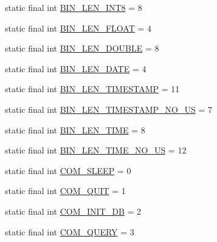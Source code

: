 \begin{DoxyCompactItemize}
static final int \mbox{\hyperlink{classcom_1_1mysql_1_1cj_1_1protocol_1_1a_1_1_native_constants_ac39a2cd0b5ccf2a222caea799aa70fb5}{B\+I\+N\+\_\+\+L\+E\+N\+\_\+\+I\+N\+T8}} = 8
\item 
static final int \mbox{\hyperlink{classcom_1_1mysql_1_1cj_1_1protocol_1_1a_1_1_native_constants_afbb783ba118a4c920b178941f1a10ef8}{B\+I\+N\+\_\+\+L\+E\+N\+\_\+\+F\+L\+O\+AT}} = 4
\item 
static final int \mbox{\hyperlink{classcom_1_1mysql_1_1cj_1_1protocol_1_1a_1_1_native_constants_a9fb79d96575734dc801304e9d55545b2}{B\+I\+N\+\_\+\+L\+E\+N\+\_\+\+D\+O\+U\+B\+LE}} = 8
\item 
static final int \mbox{\hyperlink{classcom_1_1mysql_1_1cj_1_1protocol_1_1a_1_1_native_constants_a14f50d7f7112a066ccf2230707dd4930}{B\+I\+N\+\_\+\+L\+E\+N\+\_\+\+D\+A\+TE}} = 4
\item 
static final int \mbox{\hyperlink{classcom_1_1mysql_1_1cj_1_1protocol_1_1a_1_1_native_constants_af5e3413a6a476773f385dd609bcbf814}{B\+I\+N\+\_\+\+L\+E\+N\+\_\+\+T\+I\+M\+E\+S\+T\+A\+MP}} = 11
\item 
static final int \mbox{\hyperlink{classcom_1_1mysql_1_1cj_1_1protocol_1_1a_1_1_native_constants_a4d4b932c2779750a831b2bbd9285a599}{B\+I\+N\+\_\+\+L\+E\+N\+\_\+\+T\+I\+M\+E\+S\+T\+A\+M\+P\+\_\+\+N\+O\+\_\+\+US}} = 7
\item 
static final int \mbox{\hyperlink{classcom_1_1mysql_1_1cj_1_1protocol_1_1a_1_1_native_constants_aac872561e0c72e472458e6101c41f850}{B\+I\+N\+\_\+\+L\+E\+N\+\_\+\+T\+I\+ME}} = 8
\item 
static final int \mbox{\hyperlink{classcom_1_1mysql_1_1cj_1_1protocol_1_1a_1_1_native_constants_a682e339d570c6af08eceff4f9f217d19}{B\+I\+N\+\_\+\+L\+E\+N\+\_\+\+T\+I\+M\+E\+\_\+\+N\+O\+\_\+\+US}} = 12
\item 
static final int \mbox{\hyperlink{classcom_1_1mysql_1_1cj_1_1protocol_1_1a_1_1_native_constants_a014f81f6f2a0704fe41fc12df61a791c}{C\+O\+M\+\_\+\+S\+L\+E\+EP}} = 0
\item 
static final int \mbox{\hyperlink{classcom_1_1mysql_1_1cj_1_1protocol_1_1a_1_1_native_constants_ae91fe813dbe503e34f860089bcc70f15}{C\+O\+M\+\_\+\+Q\+U\+IT}} = 1
\item 
static final int \mbox{\hyperlink{classcom_1_1mysql_1_1cj_1_1protocol_1_1a_1_1_native_constants_ab4831a468a449b80cea472b1cbd77674}{C\+O\+M\+\_\+\+I\+N\+I\+T\+\_\+\+DB}} = 2
\item 
static final int \mbox{\hyperlink{classcom_1_1mysql_1_1cj_1_1protocol_1_1a_1_1_native_constants_a195f0c3ec65195f9ec3f2cb4924fd092}{C\+O\+M\+\_\+\+Q\+U\+E\+RY}} = 3

\end{DoxyCompactItemize}
